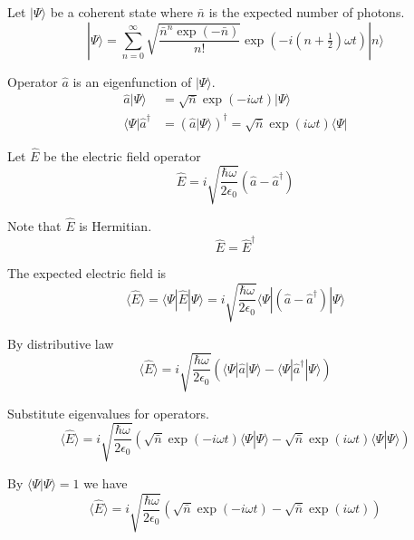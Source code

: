 \documentclass[12pt]{article}
\begin{document}
Let $|\Psi\rangle$ be a coherent state where $\bar n$ is the expected number of photons.
\begin{equation*}
|\Psi\rangle=\sum_{n=0}^\infty
\sqrt{\frac{\bar n^n\exp(-\bar n)}{n!}}
\exp\left(-i\left(n+\tfrac{1}{2}\right)\omega t\right)
|n\rangle
\end{equation*}

Operator $\hat a$ is an eigenfunction of $|\Psi\rangle$.
\begin{align*}
\hat a|\Psi\rangle&=\sqrt{\bar n}\exp(-i\omega t)|\Psi\rangle
\\
\langle\Psi|\hat a^\dag&=\left(\hat a|\Psi\rangle\right)^\dag=\sqrt{\bar n}\exp(i\omega t)\langle\Psi|
\end{align*}

Let $\hat E$ be the electric field operator
\begin{equation*}
\hat E=i\sqrt{\frac{\hbar\omega}{2\epsilon_0}}
(\hat a-\hat a^\dag)
\end{equation*}

Note that $\hat E$ is Hermitian.
\begin{equation*}
\hat E=\hat E^\dag
\end{equation*}

The expected electric field is
\begin{equation*}
\langle\hat E\rangle
=\langle\Psi|\hat E|\Psi\rangle
=i\sqrt{\frac{\hbar\omega}{2\epsilon_0}}
\langle\Psi|(\hat a-\hat a^\dag)|\Psi\rangle
\end{equation*}

By distributive law
\begin{equation*}
\langle\hat E\rangle
=i\sqrt{\frac{\hbar\omega}{2\epsilon_0}}
\left(\langle\Psi|\hat a|\Psi\rangle-\langle\Psi|\hat a^\dag|\Psi\rangle\right)
\end{equation*}

Substitute eigenvalues for operators.
\begin{equation*}
\langle\hat E\rangle
=i\sqrt{\frac{\hbar\omega}{2\epsilon_0}}
\left(\sqrt{\bar n}\exp(-i\omega t)\langle\Psi|\Psi\rangle-\sqrt{\bar n}\exp(i\omega t)\langle\Psi|\Psi\rangle\right)
\end{equation*}

By $\langle\Psi|\Psi\rangle=1$ we have
\begin{equation*}
\langle\hat E\rangle
=i\sqrt{\frac{\hbar\omega}{2\epsilon_0}}
\left(\sqrt{\bar n}\exp(-i\omega t)-\sqrt{\bar n}\exp(i\omega t)\right)
\end{equation*}
\end{document}
